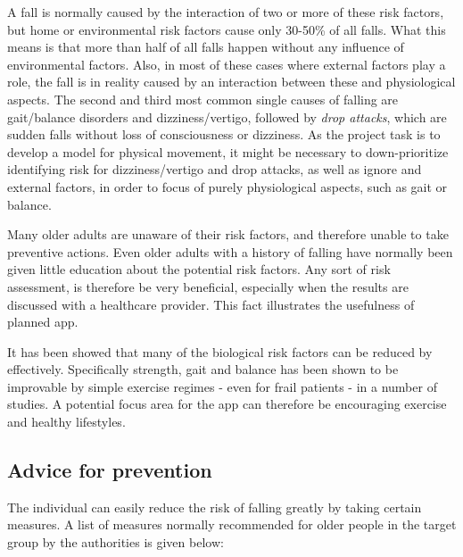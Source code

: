 A fall is normally caused by the interaction of two or more of these risk factors, but home or environmental risk factors cause only 30-50\% of all falls\cite{cdcComProg,fallsRubenstein}. What this means is that more than half of all falls happen without any influence of environmental factors. Also, in most of these cases where external factors play a role, the fall is in reality caused by an interaction between these and physiological aspects. The second and third most common single causes of falling are gait/balance disorders and dizziness/vertigo, followed by \emph{drop attacks}, which are sudden falls without loss of consciousness or dizziness\cite{fallsRubenstein}. As the project task is to develop a model for physical movement, it might be necessary to down-prioritize identifying risk for dizziness/vertigo and drop attacks, as well as ignore and external factors, in order to focus of purely physiological aspects, such as gait or balance.

Many older adults are unaware of their risk factors, and therefore unable to take preventive actions. Even older adults with a history of falling have normally been given little education about the potential risk factors. Any sort of risk assessment, is therefore be very beneficial, especially when the results are discussed with a healthcare provider\cite{cdcComProg}. This fact illustrates the usefulness of planned app. 

It has been showed that many of the biological risk factors can be reduced by effectively. Specifically strength, gait and balance has been shown to be improvable by simple exercise regimes - even for frail patients - in a number of studies\cite{cdcComProg, WHO, LMTassessPrev}. A potential focus area for the app can therefore be encouraging exercise and healthy lifestyles.

\subsection{Advice for prevention}
The individual can easily reduce the risk of falling greatly by taking certain measures. A list of measures normally recommended for older people in the target group by the authorities is given below\cite{cdcPreventFalls}:

